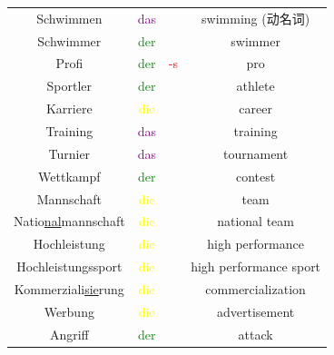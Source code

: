 \begin{center}
\begin{longtable}{|c|c|c|c|}
        \hline
        Schwimmen                      & \textcolor{purple}{das} &                                         & swimming (动名词)         \\
        Schwimmer                      & \textcolor{green}{der}  &                                         & swimmer                \\
        \hline
        Profi                          & \textcolor{green}{der}  & \textcolor{red}{-s}                     & pro                    \\
        Sportler                       & \textcolor{green}{der}  &                                         & athlete                \\
        Karriere                       & \textcolor{yellow}{die} &                                         & career                 \\
        Training                       & \textcolor{purple}{das} &                                         & training               \\
        Turnier                        & \textcolor{purple}{das} &                                         & tournament             \\
        Wettkampf                      & \textcolor{green}{der}  &                                         & contest                \\
        Mannschaft                     & \textcolor{yellow}{die} &                                         & team                   \\
        Natio\underline{nal}mannschaft & \textcolor{yellow}{die} &                                         & national team          \\
        Hochleistung                   & \textcolor{yellow}{die} &                                         & high performance       \\
        Hochleistungssport             & \textcolor{yellow}{die} &                                         & high performance sport \\
        Kommerziali\underline{sie}rung & \textcolor{yellow}{die} &                                         & commercialization      \\
        Werbung                        & \textcolor{yellow}{die} &                                         & advertisement          \\
        \hline
        Angriff                        & \textcolor{green}{der}  &                                         & attack                 \\

\end{longtable}
\end{center}
